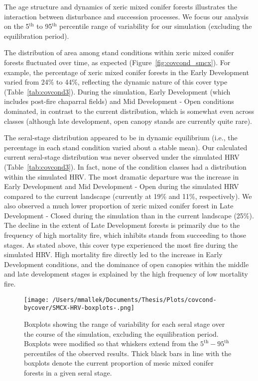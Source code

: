 The age structure and dynamics of xeric mixed conifer forests illustrates the interaction between disturbance and succession processes. We focus our analysis on the 5$^{\text{th}}$ to 95$^{\text{th}}$ percentile range of variability for our simulation (excluding the equilibration period). %

The distribution of area among stand conditions within xeric mixed conifer forests fluctuated over time, as expected (Figure~\ref{fig:covcond_smcx}). For example, the percentage of xeric mixed conifer forests in the Early Development varied from 24\% to 44\%, reflecting the dynamic nature of this cover type (Table~\ref{tab:covcond3}). During the simulation, Early Development (which includes post-fire chaparral fields) and Mid Development - Open conditions dominated, in contrast to the current distribution, which is somewhat even across classes (although late development, open canopy stands are currently quite rare).  %

The seral-stage distribution appeared to be in dynamic equilibrium (i.e., the percentage in each stand condition varied about a stable mean). Our calculated current seral-stage distribution was never observed under the simulated HRV (Table~\ref{tab:covcond3}). In fact, none of the condition classes had a distribution within the simulated HRV. The most dramatic departure was the increase in Early Development and Mid Development - Open during the simulated HRV compared to the current landscape (currently at 19\% and 11\%, respectively). We also observed a much lower proportion of xeric mixed conifer forest in Late Development - Closed during the simulation than in the current landscape (25\%). The decline in the extent of Late Development forests is primarily due to the frequency of high mortality fire, which inhibits stands from succeeding to those stages. As stated above, this cover type experienced the most fire during the simulated HRV. High mortality fire directly led to the increase in Early Development conditions, and the dominance of open canopies within the middle and late development stages is explained by the high frequency of low mortality fire.



\begin{figure}[!htbp]
  \centering
    \texttt{[image: /Users/mmallek/Documents/Thesis/Plots/covcond-bycover/SMCX-HRV-boxplots-.png]}
  \caption{Boxplots showing the range of variability for each seral stage over the course of the simulation, excluding the equilibration period. Boxplots were modified so that whiskers extend from the $5^{\text{th}} - 95^{\text{th}}$ percentiles of the observed results. Thick black bars in line with the boxplots denote the current proportion of mesic mixed conifer forests in a given seral stage.} 
  \label{fig:covcond_smcx_boxplots}
\end{figure}

